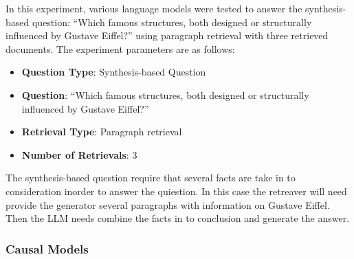 \documentclass[11pt]{wseas}
\begin{document}
In this experiment, various language models were tested to answer the
synthesis-based question: ``Which famous structures, both designed or
structurally influenced by Gustave Eiffel?'' using paragraph retrieval
with three retrieved documents. The experiment parameters are as
follows:

\begin{itemize}
\tightlist
\item
  \textbf{Question Type}: Synthesis-based Question
\item
  \textbf{Question}: ``Which famous structures, both designed or
  structurally influenced by Gustave Eiffel?''
\item
  \textbf{Retrieval Type}: Paragraph retrieval
\item
  \textbf{Number of Retrievals}: 3
\end{itemize}

The synthesis-based question require that several facts are take in to
consideration inorder to answer the quiestion. In this case the
retreaver will need provide the generator several paragraphs with
information on Gustave Eiffel. Then the LLM needs combine the facts in
to conclusion and generate the answer.

\subsubsection{Causal Models}\label{causal-models}
\end{document}

